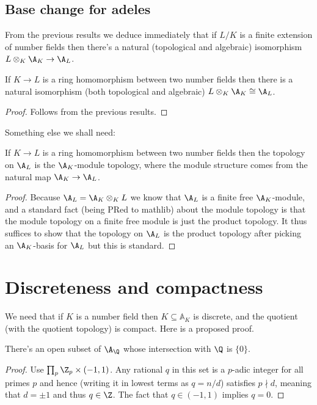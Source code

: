 \subsection{Base change for adeles}

From the previous results we deduce immediately that if $L/K$ is a finite extension
of number fields then there's a natural (topological and algebraic) isomorphism
$L\otimes_K\A_K\to \A_L$.

\begin{theorem}
  \label{NumberField.AdeleRing.baseChangeEquiv}
  If $K\to L$ is a ring homomorphism between two number fields then there is a natural isomorphism
  (both topological and algebraic) $L\otimes_K\A_K\cong\A_L$.
\end{theorem}
\begin{proof}
  Follows from the previous results.
\end{proof}

Something else we shall need:

\begin{theorem}
  \label{NumberField.AdeleRing.baseChange_moduleTopology}
  If $K\to L$ is a ring homomorphism between two number fields then the topology on $\A_L$
  is the $\A_K$-module topology, where the module structure comes from the
  natural map $\A_K\to\A_L$.
\end{theorem}
\begin{proof}
  Because $\A_L=\A_K\otimes_{K}L$ we know that $\A_L$ is a finite free $\A_K$-module,
  and a standard fact (being PRed to mathlib) about the module topology is that the module topology
  on a finite free module is just the product topology. It thus suffices to show that
  the topology on $\A_L$ is the product topology after picking an $\A_K$-basis for $\A_L$
  but this is standard.
\end{proof}

\section{Discreteness and compactness}

We need that if $K$ is a number field then
$K\subseteq\mathbb{A}_K$ is discrete, and the quotient (with the
quotient topology) is compact. Here is a proposed proof.

\begin{theorem}
  \label{Rat.AdeleRing.zero_discrete}
  \leanok
  There's an open subset of $\A_{\Q}$ whose intersection with $\Q$ is $\{0\}$.
\end{theorem}
\begin{proof}
  Use $\prod_p{\Z_p}\times(-1,1)$. Any rational $q$ in this set is a $p$-adic
  integer for all primes $p$ and hence (writing it in lowest terms as $q=n/d$)
  satisfies $p\nmid d$, meaning that $d=\pm1$ and thus $q\in\Z$. The fact
  that $q\in(-1,1)$ implies $q=0$.
\end{proof}

